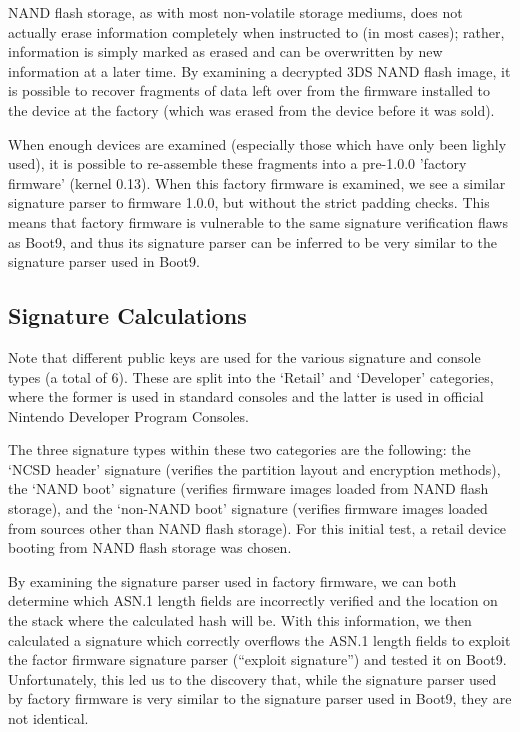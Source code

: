 \documentclass[journal]{IEEEtran}
\begin{document}
NAND flash storage, as with most non-volatile storage mediums, does not actually
erase information completely when instructed to (in most cases); rather,
information is simply marked as erased and can be overwritten by new information
at a later time. By examining a decrypted 3DS NAND flash image, it is possible
to recover fragments of data left over from the firmware installed to the device
at the factory (which was erased from the device before it was sold).

When enough devices are examined (especially those which have only been lighly
used), it is possible to re-assemble these fragments into a pre-1.0.0 'factory
firmware' (kernel 0.13). When this factory firmware is examined, we see a
similar signature parser to firmware 1.0.0, but without the strict padding
checks. This means that factory firmware is vulnerable to the same signature
verification flaws as Boot9, and thus its signature parser can be inferred to be
very similar to the signature parser used in Boot9.

\subsection{Signature Calculations}

Note that different public keys are used for the various signature and console
types (a total of 6). These are split into the `Retail' and `Developer'
categories, where the former is used in standard consoles and the latter is used
in official Nintendo Developer Program Consoles.

The three signature types within these two categories are the following: the
`NCSD header' signature (verifies the partition layout and encryption methods),
the `NAND boot' signature (verifies firmware images loaded from NAND flash
storage), and the `non-NAND boot' signature (verifies firmware images loaded
from sources other than NAND flash storage). For this initial test, a retail
device booting from NAND flash storage was chosen.

By examining the signature parser used in factory firmware, we can both
determine which ASN.1 length fields are incorrectly verified and the location on
the stack where the calculated hash will be. With this information, we then
calculated a signature which correctly overflows the ASN.1 length fields to
exploit the factor firmware signature parser (``exploit signature'') and tested
it on Boot9. Unfortunately, this led us to the discovery that, while the
signature parser used by factory firmware is very similar to the signature
parser used in Boot9, they are not identical.
\end{document}
